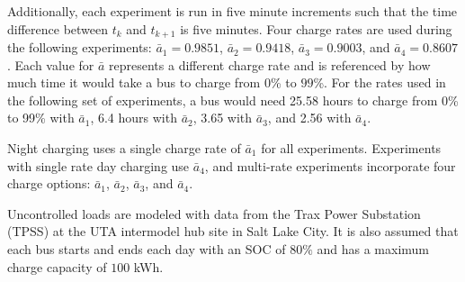 	\par Additionally, each experiment is run in five minute increments such that the time difference between $t_k$ and $t_{k+1}$ is five minutes.  Four charge rates are used during the following experiments: $\bar{a}_1 = 0.9851$, $\bar{a}_2 = 0.9418$, $\bar{a}_3 = 0.9003$, and $\bar{a}_4 = 0.8607$.  Each value for $\bar{a}$ represents a different charge rate and is referenced by how much time it would take a bus to charge from $0$\% to $99$\%. For the rates used in the following set of experiments, a bus would need 25.58 hours to charge from 0\% to 99\% with $\bar{a}_1$, 6.4 hours with $\bar{a}_2$, 3.65 with $\bar{a}_3$, and 2.56 with $\bar{a}_4$. 
	\par Night charging uses a single charge rate of $\bar{a}_1$ for all experiments. Experiments with single rate day charging use $\bar{a}_4$, and multi-rate experiments incorporate four charge options: $\bar{a}_1$, $\bar{a}_2$, $\bar{a}_3$, and $\bar{a}_4$.
	\par Uncontrolled loads are modeled with data from the Trax Power Substation (TPSS) at the UTA intermodel hub site in Salt Lake City. It is also assumed that each bus starts and ends each day with an SOC of $80\%$ and has a maximum charge capacity of $100$ kWh.
